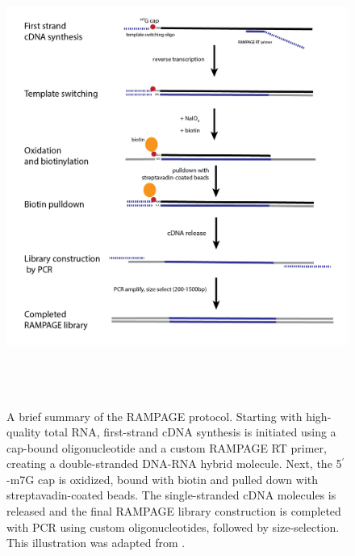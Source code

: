 \documentclass[runningheads,a4paper]{llncs}
\begin{document}
\begin{linenumbers}
\begin{figure}
\centering
\includegraphics[height=15cm]{Figures/Insect_Chapter_Figure_1}
\caption{A brief summary of the RAMPAGE protocol. Starting with high-quality total RNA, first-strand cDNA synthesis is initiated using a cap-bound oligonucleotide and a custom RAMPAGE RT primer, creating a double-stranded DNA-RNA hybrid molecule. Next, the 5$^\prime$-m7G cap is oxidized, bound with biotin and pulled down with streptavadin-coated beads. The single-stranded cDNA molecules is released and the final RAMPAGE library construction is completed with PCR using custom oligonucleotides, followed by size-selection. This illustration was adapted from \cite{Batut:2013fu}.}
\label{fig:figure1}
\end{figure}


\end{linenumbers}
\end{document}
